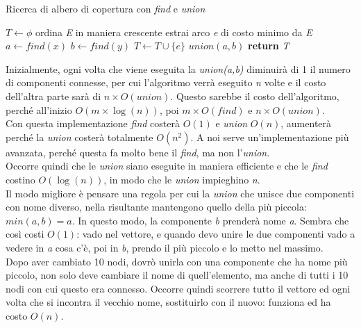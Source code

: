 \begin{algorithm}
	\caption{Ricerca di albero di copertura con \textit{find} e \textit{union}}\label{alg:AC2}
	\begin{algorithmic}[1]
			\State $T \gets \phi$  
			\State ordina \textit{E} in maniera crescente
				\State estrai arco \textit{e} di costo minimo da \textit{E}
				\State $a \gets find(x)$
				\State $b \gets find(y)$
					\State $T \gets T \cup \{e\}$
					\State $union(a,b)$
				\EndIf
			\EndWhile
			\State \textbf{return} \textit{T}
		\EndFunction
	\end{algorithmic}
\end{algorithm}
Inizialmente, ogni volta che viene eseguita la \textit{union(a,b)} diminuirà di 1 il numero di componenti connesse, per cui l'algoritmo verrà eseguito \textit{n} volte e il costo dell'altra parte sarà di $n\times O(union)$. Questo sarebbe il costo dell'algoritmo, perché all'inizio $O(m \times \log(n))$, poi $m\times O(find)$ e $n\times O(union)$. \\
Con questa implementazione \textit{find} costerà $O(1)$ e \textit{union} $O(n)$, aumenterà perché la \textit{union} costerà totalmente $O(n^2)$. A noi serve un'implementazione più avanzata, perché questa fa molto bene il \textit{find}, ma non l'\textit{union}. \\
Occorre quindi che le \textit{union} siano eseguite in maniera efficiente e che le \textit{find} costino $O(\log(n))$, in modo che le \textit{union} impieghino \textit{n}. \\
Il modo migliore è pensare una regola per cui la \textit{union} che unisce due componenti con nome diverso, nella risultante mantengono quello della più piccola: $min(a,b) = a$. In questo modo, la componente \textit{b} prenderà nome \textit{a}. Sembra che così costi $O(1)$: vado nel vettore, e quando devo unire le due componenti vado a vedere in \textit{a} cosa c'è, poi in \textit{b}, prendo il più piccolo e lo metto nel massimo. \\
Dopo aver cambiato 10 nodi, dovrò unirla con una componente che ha nome più piccolo, non solo deve cambiare il nome di quell'elemento, ma anche di tutti i 10 nodi con cui questo era connesso. Occorre quindi scorrere tutto il vettore ed ogni volta che si incontra il vecchio nome, sostituirlo con il nuovo: funziona ed ha costo $O(n)$.

